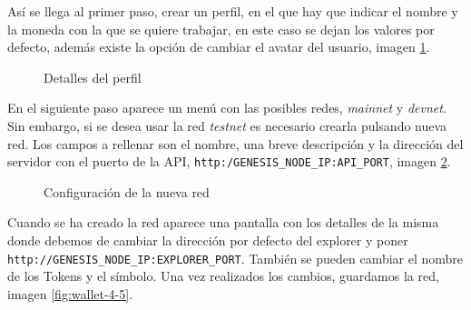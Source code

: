 \newpage
Así se llega al primer paso, crear un perfil, en el que hay que indicar el nombre y la moneda con la que se quiere trabajar, en este caso se dejan los valores por defecto, además existe la opción de cambiar el avatar del usuario, imagen \ref{fig:wallet-2}.

\begin{figure}[H]
	\centering
	\caption{Detalles del perfil}
	\label{fig:wallet-2}
\end{figure}

En el siguiente paso aparece un menú con las posibles redes, \textit{mainnet} y \textit{devnet}. Sin embargo, si se desea usar la red \textit{testnet} es necesario crearla pulsando nueva red. Los campos a rellenar son el nombre, una breve descripción y la dirección del servidor con el puerto de la API, \texttt{http:/GENESIS\_NODE\_IP:API\_PORT}, imagen \ref{fig:wallet-3}.

\begin{figure}[H]
	\centering
	\caption{Configuración de la nueva red}
	\label{fig:wallet-3}
\end{figure}

\newpage
Cuando se ha creado la red aparece una pantalla con los detalles de la misma donde debemos de cambiar la dirección por defecto del explorer y poner \texttt{http://GENESIS\_NODE\_IP:EXPLORER\_PORT}. También se pueden cambiar el nombre de los Tokens y el símbolo. Una vez realizados los cambios, guardamos la red, imagen \ref{fig:wallet-4-5}.

